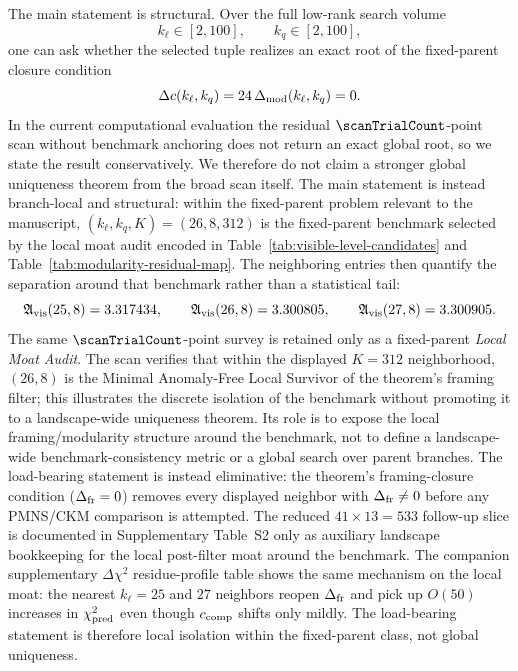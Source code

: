 \documentclass[11pt]{article}
\begin{document}
The main statement is structural. Over the full low-rank search volume
\begin{equation}
 k_{\ell}\in[2,100],
 \qquad
 k_q\in[2,100],
\end{equation}
one can ask whether the selected tuple realizes an exact root of the fixed-parent closure condition
\begin{equation}
 \Delta c(k_{\ell},k_q)=24\,\Delta_{\rm mod}(k_{\ell},k_q)=0.
\end{equation}
In the current computational evaluation the residual $\scanTrialCount$-point scan without benchmark anchoring does not return an exact global root, so we state the result conservatively. We therefore do not claim a stronger global uniqueness theorem from the broad scan itself. The main statement is instead branch-local and structural: within the fixed-parent problem relevant to the manuscript, $(k_{\ell},k_q,K)=(26,8,312)$ is the fixed-parent benchmark selected by the local moat audit encoded in Table~\ref{tab:visible-level-candidates} and Table~\ref{tab:modularity-residual-map}. The neighboring entries then quantify the separation around that benchmark rather than a statistical tail:
\begin{equation}
 \mathfrak A_{\rm vis}(25,8)=3.317434,
 \qquad
 \mathfrak A_{\rm vis}(26,8)=3.300805,
 \qquad
 \mathfrak A_{\rm vis}(27,8)=3.300905.
\end{equation}
The same $\scanTrialCount$-point survey is retained only as a fixed-parent \emph{Local Moat Audit}. The scan verifies that within the displayed $K=312$ neighborhood, $(26,8)$ is the Minimal Anomaly-Free Local Survivor of the theorem's framing filter; this illustrates the discrete isolation of the benchmark without promoting it to a landscape-wide uniqueness theorem. Its role is to expose the local framing/modularity structure around the benchmark, not to define a landscape-wide benchmark-consistency metric or a global search over parent branches. The load-bearing statement is instead eliminative: the theorem's framing-closure condition ($\Delta_{\rm fr}=0$) removes every displayed neighbor with $\Delta_{\rm fr}\neq0$ before any PMNS/CKM comparison is attempted. The reduced $41\times13=533$ follow-up slice is documented in Supplementary Table~S2 only as auxiliary landscape bookkeeping for the local post-filter moat around the benchmark. The companion supplementary $\Delta\chi^2$ residue-profile table shows the same mechanism on the local moat: the nearest $k_{\ell}=25$ and $27$ neighbors reopen $\Delta_{\rm fr}$ and pick up $O(50)$ increases in $\chi^2_{\rm pred}$ even though $c_{\rm comp}$ shifts only mildly. The load-bearing statement is therefore local isolation within the fixed-parent class, not global uniqueness.
\end{document}
